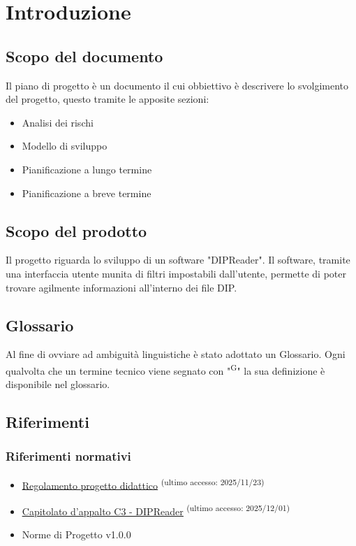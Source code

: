 \documentclass[a4paper,12pt]{article}
\begin{document}
\tableofcontents

\newpage


\section{Introduzione}
\subsection{Scopo del documento}
Il piano di progetto è un documento il cui obbiettivo è descrivere lo svolgimento del progetto, questo tramite le apposite sezioni: 
\begin{itemize}
    \item Analisi dei rischi
    \item Modello di sviluppo
    \item Pianificazione a lungo termine
    \item Pianificazione a breve termine
\end{itemize}
\subsection{Scopo del prodotto}
Il progetto riguarda lo sviluppo di un software "DIPReader". Il software, tramite una interfaccia utente munita di filtri impostabili dall'utente, permette di poter trovare agilmente informazioni all'interno dei file DIP.
\subsection{Glossario}
Al fine di ovviare ad ambiguità linguistiche è stato adottato un Glossario. Ogni qualvolta che un termine tecnico viene segnato con "\textsuperscript{G}" la sua definizione è disponibile nel glossario.

\subsection{Riferimenti}
\subsubsection{Riferimenti normativi}
\begin{itemize}
    \item \href{https://www.math.unipd.it/~tullio/IS-1/2025/Dispense/PD1.pdf}{\ul{Regolamento progetto didattico}}  \textsuperscript{(ultimo accesso: 2025/11/23)}
    \item \href{https://www.math.unipd.it/~tullio/IS-1/2025/Progetto/C3.pdf}{\ul{Capitolato d'appalto C3 - DIPReader}}  \textsuperscript{(ultimo accesso: 2025/12/01)}
    \item Norme di Progetto v1.0.0
\end{itemize}
\end{document}
